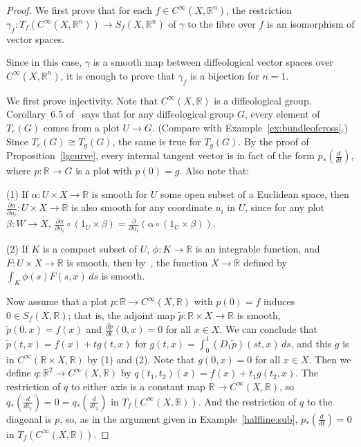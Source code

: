 \documentclass[12pt]{amsart}
\theoremstyle{remark}
\newcommand{\ra}{\to}
\def \R{\mathbb{R}}
\begin{document}
\begin{proof}
We first prove that for each $f \in C^\infty(X,\R^n)$,
the restriction $\gamma_f:T_f(C^\infty(X,\R^n)) \ra S_f(X,\R^n)$ of $\gamma$
to the fibre over $f$ is an isomorphism of vector spaces.

Since in this case, $\gamma$ is a smooth map between diffeological
vector spaces over $C^\infty(X,\R^n)$,
it is enough to prove that $\gamma_f$ is a bijection for $n=1$.

We first prove injectivity.
Note that $C^\infty(X,\R)$ is a diffeological group.
Corollary~6.5 of~\cite{HM} says that for any diffeological group $G$,
every element of $T_e(G)$ comes from a plot $U \ra G$.
(Compare with Example~\ref{ex:bundleofcross}.)
Since $T_e(G) \cong T_g(G)$, the same is true for $T_g(G)$.
By the proof of Proposition~\ref{lgcurve}, every internal tangent vector
is in fact of the form $p_*(\frac{d}{dt})$, where $p : \R \to G$ is
a plot with $p(0) = g$.
Also note that:

(1) If $\alpha:U \times X \ra \R$ is smooth
for $U$ some open subset of a Euclidean space,
then $\frac{\partial \alpha}{\partial u_i}:U \times X \ra \R$
is also smooth for any coordinate $u_i$ in $U$,
since for any plot $\beta:W \ra X$, $\frac{\partial \alpha}{\partial u_i} \circ (1_U \times \beta)=\frac{\partial}{\partial u_i}(\alpha \circ (1_U \times \beta))$.

(2) If $K$ is a compact subset of $U$,
$\phi:K \ra \R$ is an integrable function,
and $F:U \times X \ra \R$ is smooth,
then by~\cite[Theorem~V.2.9.9]{G},
the function $X \ra \R$ defined by $\int_K \phi(s) F(s,x) \, ds$ is smooth.

Now assume that a plot $p:\R \ra C^\infty(X,\R)$
with $p(0)=f$ induces $0 \in S_f(X,\R)$;
that is, the adjoint map $\tilde{p}:\R \times X \ra \R$ is smooth,
$\tilde{p}(0,x)=f(x)$ and $\frac{\partial \tilde{p}}{\partial t}(0,x)=0$
for all $x \in X$.
We can conclude that $\tilde{p}(t,x)=f(x)+tg(t,x)$
for $g(t,x)=\int_0^1 (D_1 \tilde{p})(st,x) \, ds$,
%
%
and this $g$ is in $C^\infty(\R \times X,\R)$ by (1) and (2).
Note that $g(0,x)=0$ for all $x \in X$.
Then we define $q : \R^2 \ra C^\infty(X,\R)$ by
$q(t_1,t_2)(x) = f(x)+t_1 g(t_2,x)$.
The restriction of $q$ to
either axis is a constant map $\R \ra C^\infty(X,\R)$,
so $q_*(\frac{d}{dt_1}) = 0 = q_*(\frac{d}{dt_2})$ in $T_f(C^\infty(X,\R))$.
And the restriction of $q$ to the diagonal is $p$, so,
as in the argument given in Example~\ref{halfline:sub},
$p_*(\frac{d}{dt}) = 0$ in $T_f(C^\infty(X,\R))$.


\end{proof}
\end{document}
